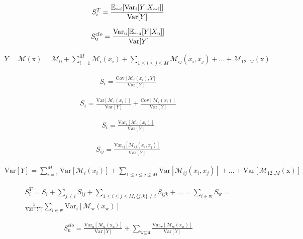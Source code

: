 \begin{align}
S_{i}^T = \frac{\operatorname*{\mathbb{E}}_{\sim i}[\text{Var}_{i}[Y|X_{\sim i}]]}{\text{Var}[Y]}
\end{align}

\begin{align}
S_\text{u}^{clo} = \frac{\text{Var}_\text{u}[\operatorname*{\mathbb{E}}_{\sim \text{u}}[Y|X_\text{u} ]]}{\text{Var}[Y]}
\end{align}


\begin{align}
Y = \mathcal{M}(\text{x}) = \mathcal{M}_0 + \sum_{i=1}^{M} \mathcal{M}_i(x_i) + \sum_{1 \leq i \leq j \leq M} \mathcal{M}_{ij}(x_i,x_j) + ... + \mathcal{M}_{12..M}(\text{x})
\end{align}

\begin{align}
S_i = \frac{\text{Cov}[\mathcal{M}_i(x_i), Y]}{\text{Var}[Y]}
\end{align}

\begin{align}
S_i = \frac{\text{Var}[\mathcal{M}_i(x_i)]}{\text{Var}[Y]} + \frac{\text{Cov}[\mathcal{M}_i(x_i)]}{\text{Var}[Y]}
\end{align}

\begin{align}
S_i = \frac{\text{Var}_i[\mathcal{M}_i(x_i)]}{\text{Var}[Y]}
\end{align}

\begin{align}
S_{ij} = \frac{\text{Var}_{ij}[\mathcal{M}_{ij}(x_i,x_j)]}{\text{Var}[Y]}
\end{align}

\begin{align}
\text{Var}[Y] =  \sum_{i=1}^{M} \text{Var}[\mathcal{M}_i(x_i)] + \sum_{1 \leq i \leq j \leq M} \text{Var}[\mathcal{M}_{ij}(x_i,x_j)] + ... + \text{Var}[\mathcal{M}_{12..M}(\text{x})]
\end{align}

\begin{equation}
\begin{aligned}
S_i^T = S_i + \sum_{j \ne i} S_{ij} + \sum_{1 \leq i \leq j \leq M,\{j,k\} \ne i} S_{ijk} + ... = \sum_{i \in \text{w}} S_\text{w} = \\
\frac{1}{\text{Var}[Y]}\sum_{i \in \text{w}} \text{Var}_i[\mathcal{M}_\text{w}(x_\text{w})]
\end{aligned}
\end{equation}

\begin{align}
S_\text{u}^{clo} = \frac{\text{Var}_\text{u}[\mathcal{M}_\text{u}(\text{x}_\text{u})]}{\text{Var}[Y]} +  \sum_{\text{w} \subseteq \text{u}} \frac{\text{Var}_\text{w}[\mathcal{M}_\text{w}(\text{x}_\text{w})]}{\text{Var}[Y]}
\end{align}


